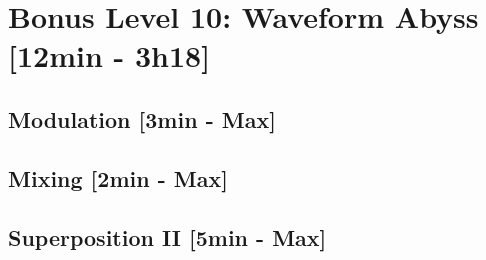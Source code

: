 

\section{Bonus Level 10: Waveform Abyss [12min - 3h18]}
\subsection{Modulation [3min - Max]}

\subsection{Mixing [2min - Max]}

\subsection{Superposition II [5min - Max]}


